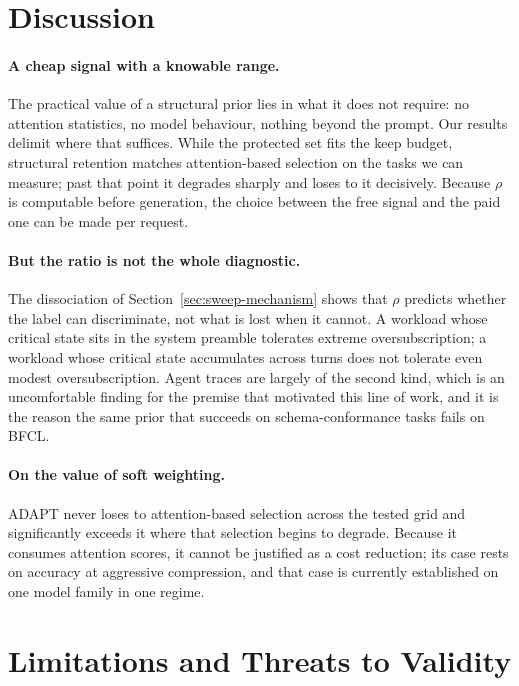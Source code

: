 \section{Discussion}
\label{sec:discussion}

\paragraph{A cheap signal with a knowable range.}
The practical value of a structural prior lies in what it does not require: no
attention statistics, no model behaviour, nothing beyond the prompt.  Our
results delimit where that suffices.  While the protected set fits the keep
budget, structural retention matches attention-based selection on the tasks we
can measure; past that point it degrades sharply and loses to it decisively.
Because $\rho$ is computable before generation, the choice between the free
signal and the paid one can be made per request.

\paragraph{But the ratio is not the whole diagnostic.}
The dissociation of Section~\ref{sec:sweep-mechanism} shows that $\rho$ predicts
whether the label can discriminate, not what is lost when it cannot.  A workload
whose critical state sits in the system preamble tolerates extreme
oversubscription; a workload whose critical state accumulates across turns does
not tolerate even modest oversubscription.  Agent traces are largely of the
second kind, which is an uncomfortable finding for the premise that motivated
this line of work, and it is the reason the same prior that succeeds on
schema-conformance tasks fails on BFCL.

\paragraph{On the value of soft weighting.}
ADAPT never loses to attention-based selection across the tested grid and
significantly exceeds it where that selection begins to degrade.  Because it
consumes attention scores, it cannot be justified as a cost reduction; its case
rests on accuracy at aggressive compression, and that case is currently
established on one model family in one regime.

\section{Limitations and Threats to Validity}
\label{sec:limitations}

